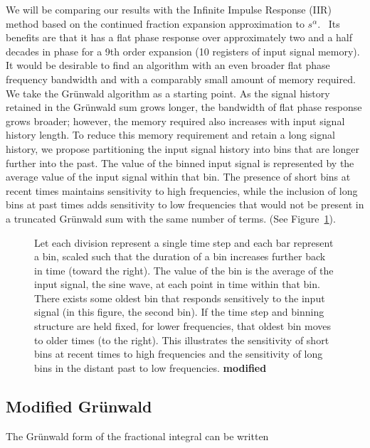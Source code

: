 We will be comparing our results with the Infinite Impulse Response (IIR) method 
based on the continued fraction expansion approximation to
$s^\alpha$.~\cite{Chen:04a} Its benefits are that it has a flat phase response over
approximately two and a half decades in phase for a 9th order
expansion (10 registers of input signal memory). It would be desirable
to find an algorithm with an even broader flat phase frequency
bandwidth and with a comparably small amount of memory required. We
take the Gr{\"u}nwald algorithm as a starting point. As the signal history
retained in the Gr{\"u}nwald sum grows longer, the bandwidth of flat phase
response grows broader; however, the memory required also increases
with input signal history length. To reduce this memory requirement
and retain a long signal history, we propose partitioning the input
signal history into bins that are longer further into the past. The
value of the binned input signal is represented by the average value
of the input signal within that bin. The presence of short bins at
recent times maintains sensitivity to high frequencies, while the 
inclusion of long bins at past times adds sensitivity to low frequencies 
that would not be present in a truncated Gr{\"u}nwald 
sum with the same number of terms. (See Figure~\ref{fig:freqScaling}).

\begin{figure}
\label{fig:freqScaling}
\caption{Let each division represent a single time step and each bar represent a bin, scaled such that the duration of a bin increases further back in time (toward the right). The value of the bin is the average of the input signal, the sine wave, at each point in time within that bin. There exists some oldest bin that responds sensitively to the input signal (in this figure, the second bin). If the time step and binning structure are held fixed, for lower frequencies, that oldest bin moves to older times (to the right). This illustrates the sensitivity of short bins at recent times to high frequencies and the sensitivity of long bins in the distant past to low frequencies. {\bf modified}}
\end{figure}


\subsection{Modified Gr{\"u}nwald}

The Gr{\"u}nwald form of the fractional integral can be written~\cite{OldSpan:74}

